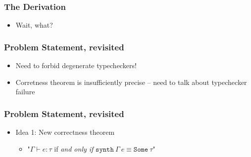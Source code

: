 \documentclass[usenames,dvipsnames]{beamer}
\newcommand{\synth}{\texttt{synth}}
\begin{document}

{
  \begin{frame}
    \frametitle{The Derivation}

    \begin{itemize}
      \item Wait, what?
    \end{itemize}
  \end{frame}
}


\begin{frame}
  \frametitle{Problem Statement, revisited}

  \begin{itemize}
    \item Need to forbid degenerate typecheckers!
    \item Corretness theorem is insufficiently precise -- need to talk about
      typechecker failure
  \end{itemize}
\end{frame}


\begin{frame}
  \frametitle{Problem Statement, revisited}

  \begin{itemize}
    \item Idea 1: New correctness theorem
      \begin{itemize}
        \item "$\Gamma \vdash e : \tau$ if \emph{and only if} $\synth
          \ \Gamma\ e \equiv \texttt{Some}\ \tau$"
      \end{itemize}
  \end{itemize}
\end{frame}
\end{document}
